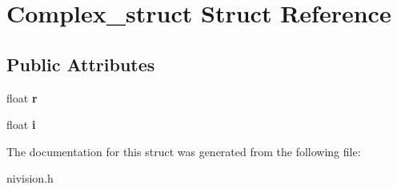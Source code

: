 \hypertarget{structComplex__struct}{
\section{Complex\_\-struct Struct Reference}
\label{structComplex__struct}
}
\subsection*{Public Attributes}
\begin{DoxyCompactItemize}
\item 
\hypertarget{structComplex__struct_a88424f193812ce1778a0b77267e89032}{
float {\bfseries r}}
\label{structComplex__struct_a88424f193812ce1778a0b77267e89032}

\item 
\hypertarget{structComplex__struct_a5b3e7f7a844bac9fe6e5ebd6944d75a5}{
float {\bfseries i}}
\label{structComplex__struct_a5b3e7f7a844bac9fe6e5ebd6944d75a5}

\end{DoxyCompactItemize}


The documentation for this struct was generated from the following file:\begin{DoxyCompactItemize}
\item 
nivision.h\end{DoxyCompactItemize}
